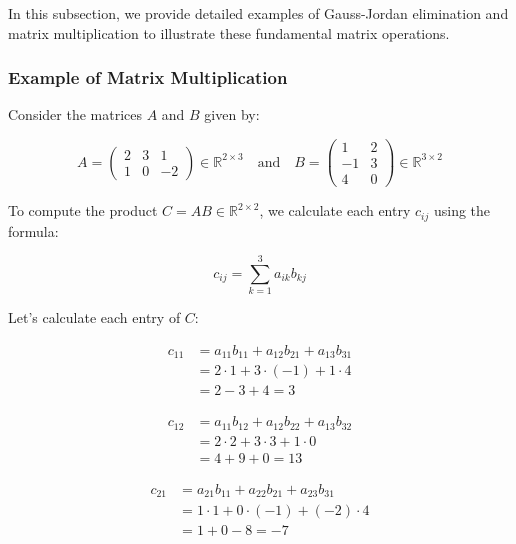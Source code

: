 In this subsection, we provide detailed examples of Gauss-Jordan elimination and matrix multiplication to illustrate these fundamental matrix operations.

\subsubsection{Example of Matrix Multiplication}

Consider the matrices \(A\) and \(B\) given by:

\begin{equation*}
A = 
\begin{pmatrix}
2 & 3 & 1 \\
1 & 0 & -2
\end{pmatrix} \in \mathbb{R}^{2 \times 3}
\quad \text{and} \quad
B = 
\begin{pmatrix}
1 & 2 \\
-1 & 3 \\
4 & 0
\end{pmatrix} \in \mathbb{R}^{3 \times 2}
\end{equation*}

To compute the product \(C = AB \in \mathbb{R}^{2 \times 2}\), we calculate each entry \(c_{ij}\) using the formula:

\begin{equation*}
c_{ij} = \sum_{k=1}^{3} a_{ik} b_{kj}
\end{equation*}

Let's calculate each entry of \(C\):

\begin{align*}
c_{11} &= a_{11}b_{11} + a_{12}b_{21} + a_{13}b_{31} \\
&= 2 \cdot 1 + 3 \cdot (-1) + 1 \cdot 4 \\
&= 2 - 3 + 4 = 3
\end{align*}

\begin{align*}
c_{12} &= a_{11}b_{12} + a_{12}b_{22} + a_{13}b_{32} \\
&= 2 \cdot 2 + 3 \cdot 3 + 1 \cdot 0 \\
&= 4 + 9 + 0 = 13
\end{align*}

\begin{align*}
c_{21} &= a_{21}b_{11} + a_{22}b_{21} + a_{23}b_{31} \\
&= 1 \cdot 1 + 0 \cdot (-1) + (-2) \cdot 4 \\
&= 1 + 0 - 8 = -7
\end{align*}

